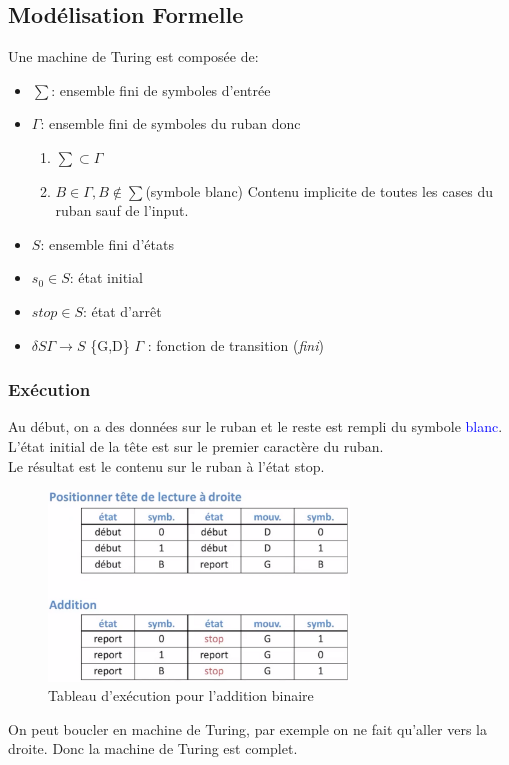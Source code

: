 \documentclass{report}
\begin{document}
\subsection{Modélisation Formelle}
\noindent
Une machine de Turing est composée de:
\begin{itemize}
\item $\sum$: ensemble fini de symboles d'entrée
\item $\Gamma$: ensemble fini de symboles du ruban donc
\begin{enumerate}
	\item $\sum \subset \Gamma$
	\item $B \in \Gamma, B \notin \sum$(symbole blanc) Contenu implicite de toutes les cases du ruban sauf de l'input.
\end{enumerate}
\item $S$: ensemble fini d'états
\item $s_0 \in S$: état initial
\item $stop \in S$: état d'arrêt
\item $ \delta  S  \Gamma \rightarrow S  $ \{G,D\} $ \Gamma $ : fonction de transition (\textit{fini})
\end{itemize}

\subsubsection{Exécution}
Au début, on a des données sur le ruban et le reste est rempli du symbole \textcolor{blue}{blanc}. L'état initial de la tête est sur le premier caractère du ruban.\\
Le résultat est le contenu sur le ruban à l'état stop.
\begin{figure}[H]
\centering
\includegraphics[width=8cm]{img/turing.png}
\caption{Tableau d'exécution pour l'addition binaire}
\end{figure}

On peut boucler en machine de Turing, par exemple on ne fait qu'aller vers la droite. Donc la machine de Turing est complet.
\end{document}
